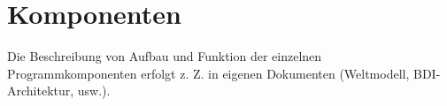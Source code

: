 
\section{Komponenten}
\label{sec:komponenten}

Die Beschreibung von Aufbau und Funktion der einzelnen Programmkomponenten
erfolgt z. Z. in eigenen Dokumenten (Weltmodell, BDI-Architektur, usw.).

